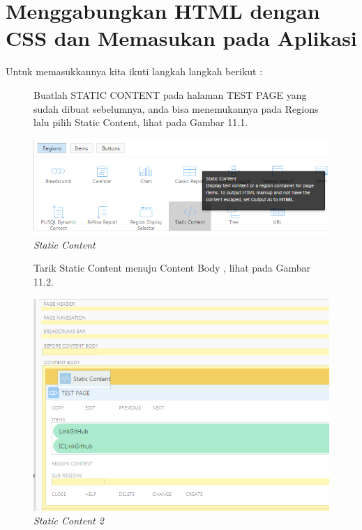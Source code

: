 \section{Menggabungkan HTML dengan CSS dan Memasukan pada Aplikasi}
Untuk memasukkannya kita ikuti langkah langkah berikut :
\begin{enumerate}
    
    \begin{figure}
	\item Buatlah STATIC CONTENT pada halaman TEST PAGE yang sudah dibuat sebelumnya, anda bisa menemukannya pada Regions lalu pilih Static Content, lihat pada Gambar 11.1.
	
        \centering
        \includegraphics[scale=0.5]{figures/bab11/1.png}
        \caption{\textit{Static Content}}
        \label{Static Content}
    \end{figure}
    
    \begin{figure}
    \item Tarik Static Content menuju Content Body , lihat pada Gambar 11.2.
        
        \centering
        \includegraphics[scale=0.5]{figures/bab11/2.png}
        \caption{\textit{Static Content 2}}
        \label{Static Content 2}
    \end{figure}
    

\end{enumerate}

